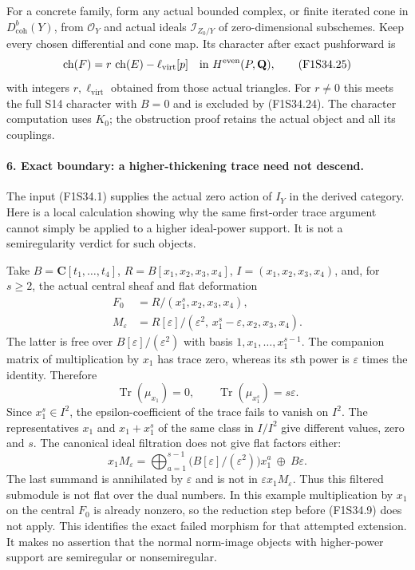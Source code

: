 For a concrete family, form any actual
bounded complex, or finite iterated cone
in $D^b_{\mathrm{coh}}(Y)$, from
$\mathcal O_Y$ and actual ideals
$\mathcal I_{Z_0/Y}$ of zero-dimensional
subschemes. Keep every chosen differential
and cone map.
Its character after exact pushforward is
\[
       \operatorname{ch}(F)
           =r\,\operatorname{ch}(E)-\ell_{\mathrm{virt}}[p]
               \quad\hbox{in }H^{\mathrm{even}}(P,\mathbf Q),
 \tag{F1S34.25}
\]
with integers $r,\ell_{\mathrm{virt}}$ obtained
from those actual triangles.
For $r\ne0$ this meets the full S14
character with $B=0$ and is excluded by
(F1S34.24).
The character computation uses $K_0$;
the obstruction proof retains the actual
object and all its couplings.

\paragraph{6. Exact boundary: a higher-thickening trace need not descend.}
The input (F1S34.1) supplies the actual zero
action of $I_Y$ in the derived category.
Here is a local calculation showing why the
same first-order trace argument cannot
simply be applied to a higher ideal-power
support. It is not a semiregularity verdict
for such objects.

Take
$B=\mathbf C[t_1,\ldots,t_4]$,
$R=B[x_1,x_2,x_3,x_4]$,
$I=(x_1,x_2,x_3,x_4)$, and, for $s\ge2$,
the actual central sheaf and flat deformation
\[
\begin{split}
 F_0&=R/(x_1^s,x_2,x_3,x_4),\\
 M_\varepsilon&=
 R[\varepsilon]/(\varepsilon^2,\,
                x_1^s-\varepsilon,x_2,x_3,x_4).
\end{split}
 \tag{F1S34.26}
\]
The latter is free over $B[\varepsilon]/
(\varepsilon^2)$ with basis
$1,x_1,\ldots,x_1^{s-1}$.
The companion matrix of multiplication by
$x_1$ has trace zero, whereas its $s$th
power is $\varepsilon$ times the identity.
Therefore
\[
 \operatorname{Tr}(\mu_{x_1})=0,\qquad
 \operatorname{Tr}(\mu_{x_1^s})=s\varepsilon.
 \tag{F1S34.27}
\]
Since $x_1^s\in I^2$, the epsilon-coefficient
of the trace fails to vanish on $I^2$.
The representatives $x_1$ and $x_1+x_1^s$
of the same class in $I/I^2$ give different
values, zero and $s$.
The canonical ideal filtration does not
give flat factors either:
\[
 x_1M_\varepsilon
   =\bigoplus_{a=1}^{s-1}
          \bigl(B[\varepsilon]/(\varepsilon^2)\bigr)x_1^a
                        \ \oplus\ B\varepsilon.
 \tag{F1S34.28}
\]
The last summand is annihilated by
$\varepsilon$ and is not in
$\varepsilon x_1M_\varepsilon$.
Thus this filtered submodule is not flat
over the dual numbers.
In this example multiplication by $x_1$
on the central $F_0$ is already nonzero,
so the reduction step before
(F1S34.9) does not apply.
This identifies the exact failed morphism
for that attempted extension.
It makes no assertion that the normal
norm-image objects with higher-power support
are semiregular or nonsemiregular.

